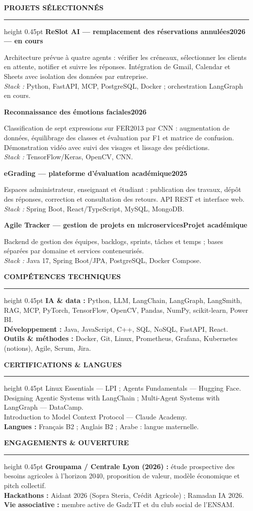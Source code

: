 \documentclass[10pt,a4paper]{article}
\newcommand{\sectiontitle}[1]{%
  \vspace{7pt}\noindent\textbf{\large\MakeUppercase{#1}}\par
  \vspace{2pt}\hrule height 0.45pt\vspace{4pt}}
\newcommand{\project}[2]{%
  \noindent\textbf{#1}\hfill\textbf{#2}\par}
\begin{document}
\sectiontitle{Projets sélectionnés}
\project{ReSlot AI — remplacement des réservations annulées}{2026 — en cours}
Architecture prévue à quatre agents : vérifier les créneaux, sélectionner les clients en attente, notifier et suivre les réponses. Intégration de Gmail, Calendar et Sheets avec isolation des données par entreprise.\\
\textit{Stack :} Python, FastAPI, MCP, PostgreSQL, Docker ; orchestration LangGraph en cours.
\vspace{4pt}

\project{Reconnaissance des émotions faciales}{2026}
Classification de sept expressions sur FER2013 par CNN : augmentation de données, équilibrage des classes et évaluation par F1 et matrice de confusion. Démonstration vidéo avec suivi des visages et lissage des prédictions.\\
\textit{Stack :} TensorFlow/Keras, OpenCV, CNN.
\vspace{4pt}

\project{eGrading — plateforme d’évaluation académique}{2025}
Espaces administrateur, enseignant et étudiant : publication des travaux, dépôt des réponses, correction et consultation des retours. API REST et interface web.\\
\textit{Stack :} Spring Boot, React/TypeScript, MySQL, MongoDB.
\vspace{4pt}

\project{Agile Tracker — gestion de projets en microservices}{Projet académique}
Backend de gestion des équipes, backlogs, sprints, tâches et temps ; bases séparées par domaine et services conteneurisés.\\
\textit{Stack :} Java 17, Spring Boot/JPA, PostgreSQL, Docker Compose.

\sectiontitle{Compétences techniques}
\textbf{IA & data :} Python, LLM, LangChain, LangGraph, LangSmith, RAG, MCP, PyTorch, TensorFlow, OpenCV, Pandas, NumPy, scikit-learn, Power BI.\\
\textbf{Développement :} Java, JavaScript, C++, SQL, NoSQL, FastAPI, React.\\
\textbf{Outils & méthodes :} Docker, Git, Linux, Prometheus, Grafana, Kubernetes (notions), Agile, Scrum, Jira.

\sectiontitle{Certifications & langues}
Linux Essentials — LPI ; Agents Fundamentals — Hugging Face.\\
Designing Agentic Systems with LangChain ; Multi-Agent Systems with LangGraph — DataCamp.\\
Introduction to Model Context Protocol — Claude Academy.\\
\textbf{Langues :} Français B2 ; Anglais B2 ; Arabe : langue maternelle.

\sectiontitle{Engagements & ouverture}
\textbf{Groupama / Centrale Lyon (2026) :} étude prospective des besoins agricoles à l’horizon 2040, proposition de valeur, modèle économique et pitch collectif.\\
\textbf{Hackathons :} Aidant 2026 (Sopra Steria, Crédit Agricole) ; Ramadan IA 2026.\\
\textbf{Vie associative :} membre active de Gadz’IT et du club social de l’ENSAM.
\end{document}
